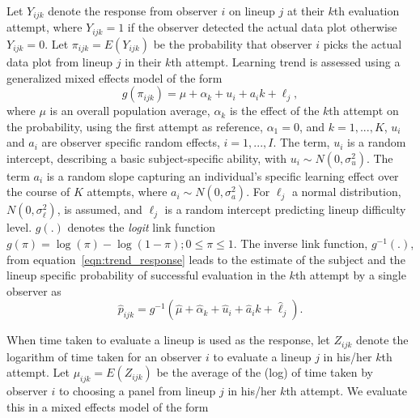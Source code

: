 \documentclass[10pt]{article}\usepackage[]{graphicx}\usepackage[]{xcolor}
\begin{document}
Let $Y_{ijk}$ denote the response from observer $i$ on lineup $j$ at their $k$th evaluation attempt, where $Y_{ijk}=1$ if the observer detected the actual data plot otherwise  $Y_{ijk}=0$. Let $\pi_{ijk}=  E(Y_{ijk})$ be the probability that  observer $i$ picks the actual data plot from lineup $j$ in their $k$th attempt. Learning trend is assessed using a generalized mixed effects model of the form
\begin{equation} \label{eqn:trend_response}
g( \pi_{ijk} )= \mu + \alpha_k + u_i +  a_{i} k + \ell_j,  
\end{equation}
where $\mu$ is an overall population average, $\alpha_k$ is the effect of the $k$th attempt on the probability, using the first attempt as reference, $\alpha_1 = 0$, and $k = 1, ..., K$, $u_i$ and $a_i$ are observer specific random effects, $i = 1, ..., I$. The term, $u_i$ is a random intercept, describing a basic subject-specific ability, with $u_i \sim N(0, \sigma_u^2)$. 
The term $a_i$ is a random slope capturing an individual's specific learning effect over the course of $K$ attempts, where $a_i \sim N(0, \sigma_a^2)$. 
For $\ell_j$ a normal distribution, $N(0, \sigma_\ell^2)$, is assumed, and $\ell_j$ is a random intercept predicting lineup difficulty level. $g(.)$ denotes the {\it logit} link function $g(\pi)=\log(\pi) - \log(1-\pi); 0 \le \pi \le 1$. The inverse link function, $g^{-1}(.)$, from equation~\ref{eqn:trend_response} leads to the estimate of the subject and the lineup specific probability of successful evaluation in the $k$th attempt by a single observer as 
\begin{equation} \label{eqn:trend_power}
\hat p_{ijk} =  g^{-1}(\hat{\mu} + \hat{\alpha}_k + \hat{u}_i +  \hat{a}_i k + \hat{\ell}_j).
\end{equation}

When time taken to evaluate a lineup is used as the response, let $Z_{ijk}$ denote the logarithm of time taken for an observer $i$ to evaluate a  lineup $j$ in his/her $k$th attempt. Let $\mu_{ijk}=  E(Z_{ijk})$ be the average of the (log) of time taken by  observer $i$ to choosing a  panel from lineup $j$ in his/her $k$th attempt. We evaluate this in a mixed effects model of the form
\end{document}
